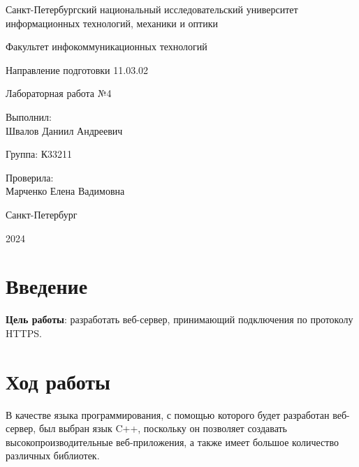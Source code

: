 \documentclass[a4paper, 14pt]{extarticle}
\begin{document}
\begin{titlepage}
  \vspace{0pt plus2fill}
  \noindent

  \vspace{0pt plus6fill}
  \begin{center}
    Санкт-Петербургский национальный исследовательский университет
    информационных технологий, механики и оптики

    \vspace{0pt plus3fill}

    Факультет инфокоммуникационных технологий

    Направление подготовки 11.03.02

    \vspace{0pt plus2fill}

    Лабораторная работа №4
  \end{center}

  \vspace{0pt plus6fill}
  \begin{flushright}
    Выполнил: \\
    Швалов Даниил Андреевич

    Группа: К33211

    Проверила: \\
    Марченко Елена Вадимовна
  \end{flushright}

  \vspace{0pt plus5fill}
  \begin{center}
    Санкт-Петербург

    2024
  \end{center}
\end{titlepage}

\section{Введение}

\textbf{Цель работы}: разработать веб-сервер, принимающий подключения по
протоколу HTTPS.

\section{Ход работы}

В качестве языка программирования, с помощью которого будет разработан
веб-сервер, был выбран язык C++, поскольку он позволяет создавать
высокопроизводительные веб-приложения, а также имеет большое количество
различных библиотек.
\end{document}
